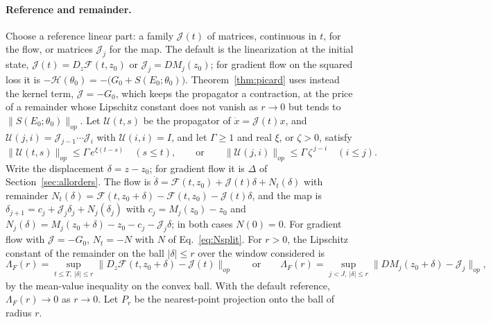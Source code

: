 \documentclass[11pt]{article}
\theoremstyle{definition}
\theoremstyle{remark}
\newcommand{\Hess}{\mathcal{H}}          %
\begin{document}
\paragraph{Reference and remainder.}
Choose a reference linear part: a family $\mathcal{J}(t)$ of matrices, continuous in $t$, for the flow, or matrices $\mathcal{J}_j$ for the map.
The default is the linearization at the initial state, $\mathcal{J}(t) = D_z\mathcal{F}(t, z_0)$ or $\mathcal{J}_j = DM_j(z_0)$; for gradient flow on the squared loss it is $-\Hess(\theta_0) = -\big(G_0 + S(E_0;\theta_0)\big)$.
Theorem~\ref{thm:picard} uses instead the kernel term, $\mathcal{J} = -G_0$, which keeps the propagator a contraction, at the price of a remainder whose Lipschitz constant does not vanish as $r\to0$ but tends to $\|S(E_0;\theta_0)\|_{op}$.
Let $\mathcal{U}(t,s)$ be the propagator of $\dot x = \mathcal{J}(t)x$, and $\mathcal{U}(j,i) = \mathcal{J}_{j-1}\cdots\mathcal{J}_i$ with $\mathcal{U}(i,i) = I$, and let $\Gamma\ge1$ and real $\xi$, or $\zeta > 0$, satisfy
\begin{equation}\label{eq:propbound}
\|\mathcal{U}(t,s)\|_{op}\le\Gamma\,e^{\xi(t-s)}\quad(s\le t),\qquad\text{or}\qquad \|\mathcal{U}(j,i)\|_{op}\le\Gamma\,\zeta^{\,j-i}\quad(i\le j).
\end{equation}
Write the displacement $\delta = z - z_0$; for gradient flow it is $\Delta$ of Section~\ref{sec:allorders}.
The flow is $\dot\delta = \mathcal{F}(t,z_0) + \mathcal{J}(t)\delta + N_t(\delta)$ with remainder $N_t(\delta) = \mathcal{F}(t, z_0 + \delta) - \mathcal{F}(t, z_0) - \mathcal{J}(t)\delta$, and the map is $\delta_{j+1} = c_j + \mathcal{J}_j\delta_j + N_j(\delta_j)$ with $c_j = M_j(z_0) - z_0$ and $N_j(\delta) = M_j(z_0 + \delta) - z_0 - c_j - \mathcal{J}_j\delta$; in both cases $N(0) = 0$.
For gradient flow with $\mathcal{J} = -G_0$, $N_t = -N$ with $N$ of Eq.~\eqref{eq:Nsplit}.
For $r > 0$, the Lipschitz constant of the remainder on the ball $|\delta|\le r$ over the window considered is
\begin{equation}\label{eq:LambdaF}
\Lambda_F(r) = \sup_{t\le T,\ |\delta|\le r}\|D_z\mathcal{F}(t, z_0 + \delta) - \mathcal{J}(t)\|_{op}\qquad\text{or}\qquad \Lambda_F(r) = \sup_{j<J,\ |\delta|\le r}\|DM_j(z_0 + \delta) - \mathcal{J}_j\|_{op},
\end{equation}
by the mean-value inequality on the convex ball.
With the default reference, $\Lambda_F(r)\to0$ as $r\to0$.
Let $P_r$ be the nearest-point projection onto the ball of radius $r$.
\end{document}
